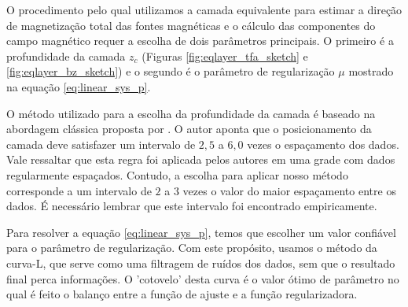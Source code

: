 O procedimento pelo qual utilizamos a camada equivalente para estimar a direção de magnetização total das fontes magnéticas e o cálculo das componentes do campo magnético requer a escolha de dois parâmetros principais. O primeiro é a profundidade da camada $z_c$ (Figuras \ref{fig:eqlayer_tfa_sketch} e \ref{fig:eqlayer_bz_sketch}) e o segundo é o parâmetro de regularização $\mu$ mostrado na equação \ref{eq:linear_sys_p}. 

O método utilizado para a escolha da profundidade da camada é baseado na abordagem clássica proposta por \cite{dampney1969}. O autor aponta que o posicionamento da camada deve satisfazer um intervalo de $2,5$ a $6,0$ vezes o espaçamento dos dados. Vale ressaltar que esta regra foi aplicada pelos autores em uma grade com dados regularmente espaçados. Contudo, a escolha para aplicar nosso método corresponde a um intervalo de $2$ a $3$ vezes o valor do maior espaçamento entre os dados. É necessário lembrar que este intervalo foi encontrado empiricamente. 

Para resolver a equação \ref{eq:linear_sys_p}, temos que escolher um valor confiável para o parâmetro de regularização. Com este propósito, usamos o método da curva-L, que serve como uma filtragem de ruídos dos dados, sem que o resultado final perca informações. O 'cotovelo' desta curva é o valor ótimo de parâmetro no qual é feito o balanço entre a função de ajuste e a função regularizadora. 